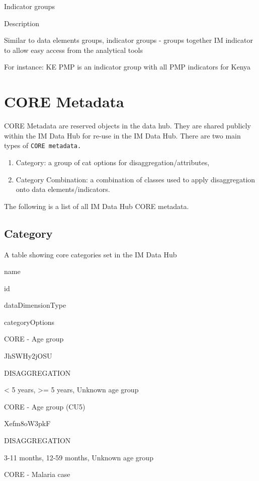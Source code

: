 \documentclass[]{book}
\providecommand{\tightlist}{%
  \setlength{\itemsep}{0pt}\setlength{\parskip}{0pt}}
\begin{document}
Indicator groups

Description

Similar to data elements groups, indicator groups - groups together IM indicator to allow easy access from the analytical tools

For instance: KE PMP is an indicator group with all PMP indicators for Kenya

\hypertarget{core-metadata}{%
\section{CORE Metadata}\label{core-metadata}}

CORE Metadata are reserved objects in the data hub. They are shared publicly within the IM Data Hub for re-use in the IM Data Hub. There are two main types of \texttt{CORE\ metadata.}

\begin{enumerate}
\def\labelenumi{\arabic{enumi}.}
\tightlist
\item
  Category: a group of cat options for disaggregation/attributes,
\item
  Category Combination: a combination of classes used to apply disaggregation onto data elements/indicators.
\end{enumerate}

The following is a list of all IM Data Hub CORE metadata.

\hypertarget{category}{%
\subsection{Category}\label{category}}

\label{tab:unnamed-chunk-15}A table showing core categories set in the IM Data Hub

name

id

dataDimensionType

categoryOptions

CORE - Age group

JhSWHy2jOSU

DISAGGREGATION

\textless{} 5 years, \textgreater{}= 5 years, Unknown age group

CORE - Age group (CU5)

Xefm8oW3pkF

DISAGGREGATION

3-11 months, 12-59 months, Unknown age group

CORE - Malaria case
\end{document}

